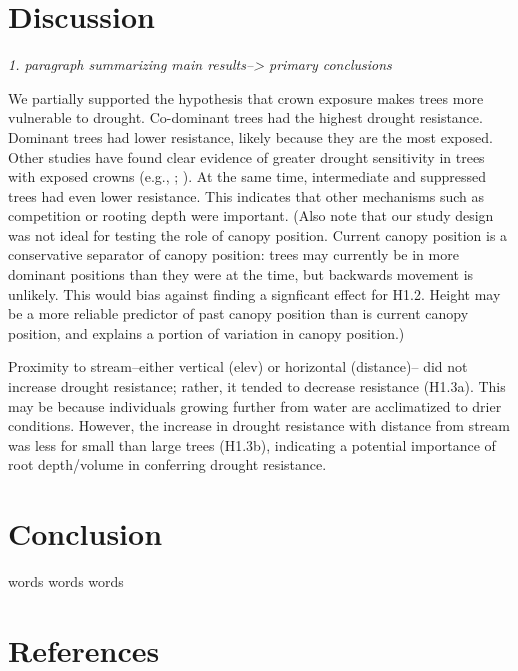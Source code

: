 \documentclass[]{book}
\begin{document}
\hypertarget{discussion}{%
\chapter{Discussion}\label{discussion}}

\emph{1. paragraph summarizing main results--\textgreater{} primary conclusions}

We partially supported the hypothesis that crown exposure makes trees more vulnerable to drought. Co-dominant trees had the highest drought resistance. Dominant trees had lower resistance, likely because they are the most exposed. Other studies have found clear evidence of greater drought sensitivity in trees with exposed crowns (e.g., \citep{suarez_factors_2004}; \citep{scharnweber_confessions_2019}). At the same time, intermediate and suppressed trees had even lower resistance. This indicates that other mechanisms such as competition or rooting depth were important. (Also note that our study design was not ideal for testing the role of canopy position. Current canopy position is a conservative separator of canopy position: trees may currently be in more dominant positions than they were at the time, but backwards movement is unlikely. This would bias against finding a signficant effect for H1.2. Height may be a more reliable predictor of past canopy position than is current canopy position, and explains a portion of variation in canopy position.)

Proximity to stream--either vertical (elev) or horizontal (distance)-- did not increase drought resistance; rather, it tended to decrease resistance (H1.3a). This may be because individuals growing further from water are acclimatized to drier conditions. However, the increase in drought resistance with distance from stream was less for small than large trees (H1.3b), indicating a potential importance of root depth/volume in conferring drought resistance.

\hypertarget{conclusion}{%
\chapter{Conclusion}\label{conclusion}}

words words words

\hypertarget{references}{%
\chapter{References}\label{references}}
\end{document}
